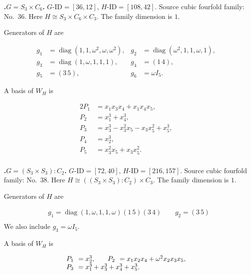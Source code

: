 \documentclass[12pt]{amsart}
\makeatletter
\numberwithin{equation}{section}
\theoremstyle{plain}
\theoremstyle{definition}
\theoremstyle{remark}
\DeclareMathOperator{\diag}{diag}
\newcommand{\PBasisLabel}[1]{\mathrlap{P_{#1}}\phantom{P_{99}}}
\newenvironment{SecEightAlignedBasis}[1]{%
  \begingroup\renewcommand{\arraystretch}{1.18}%
  \[\begin{array}{@{}#1@{}}%
}{\end{array}\]\endgroup}
\newenvironment{familydisplay}{%
  \begingroup
  \setlength{\arraycolsep}{1.35pt}%
  \renewcommand{\arraystretch}{0.96}%
  \setlength{\jot}{2pt}%
}{\endgroup}
\makeatother
\begin{document}
\par{}\medskip\noindent\textbf{.\enspace $G=S_3\times C_6$.}\label{fam:threefold-no-9}
$G\text{-ID}=[36,12]$, $H\text{-ID}=[108,42]$.
Source cubic fourfold family: No.~36.  Here
$H\cong S_3\times C_6\times C_3$.
The family dimension is $1$.
\par\smallskip\noindent Generators of $H$ are\par\nopagebreak
\begin{familydisplay}
\begin{align*}
g_{1}&=\diag(1,1,\omega^2,\omega,\omega^2),
&
g_{2}&=\diag(\omega^2,1,1,\omega,1),\\
g_{3}&=\diag(1,\omega,1,1,1),
&
g_{4}&=(1\,4),\\
g_{5}&=(3\,5),
&
g_{6}&=\omega I_5.
\end{align*}
\end{familydisplay}
\par\smallskip\noindent A basis of $W_H$ is\par\nopagebreak
\begin{familydisplay}
\begin{alignat*}{2}
P_{1}&=x_{1}x_{3}x_{4}+x_{1}x_{4}x_{5},\\[2pt]
P_{2}&=x_{1}^{3}+x_{4}^{3},\\[2pt]
P_{3}&=x_{3}^{3}-x_{3}^{2}x_{5}-x_{3}x_{5}^{2}+x_{5}^{3},\\[2pt]
P_{4}&=x_{2}^{3},\\[2pt]
P_{5}&=x_{3}^{2}x_{5}+x_{3}x_{5}^{2}.\\[2pt]
\end{alignat*}
\end{familydisplay}

\par{}\medskip\noindent\textbf{.\enspace $G=(S_3\times S_3):C_2$.}\label{fam:threefold-no-10}
$G\text{-ID}=[72,40]$, $H\text{-ID}=[216,157]$.
Source cubic fourfold family: No.~38.  Here
$H\cong((S_3\times S_3):C_2)\times C_3$.
The family dimension is $1$.
\par\smallskip\noindent Generators of $H$ are\par\nopagebreak
\begin{familydisplay}
\begin{align*}
&g_{1}=\diag(1,\omega,1,1,\omega)(1\,5)(3\,4)
\qquad g_{2}=(3\,5)\\
\end{align*}
\end{familydisplay}
\noindent We also include $g_{3}=\omega I_5$.
\par\smallskip\noindent A basis of $W_H$ is\par\nopagebreak
\begin{familydisplay}
\begin{SecEightAlignedBasis}{l@{\qquad}l}
\PBasisLabel{1}=x_{2}^{3}, & \PBasisLabel{2}=x_{1}x_{2}x_{4}+\omega^2x_{2}x_{3}x_{5},\\
\multicolumn{2}{@{}l@{}}{\PBasisLabel{3}=x_{1}^{3}+x_{3}^{3}+x_{4}^{3}+x_{5}^{3}.}
\end{SecEightAlignedBasis}
\end{familydisplay}
\end{document}
